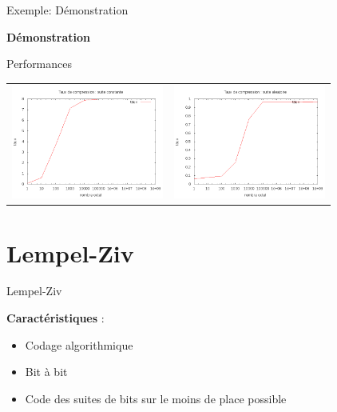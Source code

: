 \documentclass[french]{beamer}
\begin{document}
\begin{frame}{Exemple: Démonstration}
	\begin{center}
	\textbf{Démonstration}
	\end{center}
\end{frame}

\begin{frame}{Performances}
	\begin{center}
	\begin{tabular}{l | l}
	\includegraphics[width=5cm]{HConstant.png} & 
	\includegraphics[width=5cm]{aleaH.png}
	\end{tabular}
	\end{center}
\end{frame}

\section{Lempel-Ziv}
\begin{frame}{Lempel-Ziv}
	\begin{center}
	\textbf{Caractéristiques} :
	\begin{itemize}
	\item<2-4>  Codage algorithmique
	\item<3-4>  Bit à bit 
	\item <4>  Code des suites de bits sur le moins de place possible
	\end{itemize}
	\end{center}
\end{frame}
\end{document}
